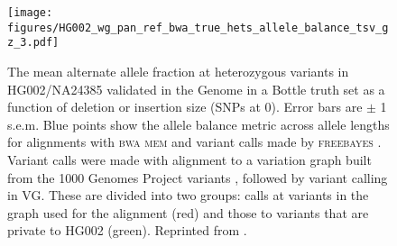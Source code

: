 
\begin{figure}[p]
\centering
\texttt{[image: figures/HG002\_wg\_pan\_ref\_bwa\_true\_hets\_allele\_balance\_tsv\_gz\_3.pdf]}
\caption[Indel allele balance in HG002]{The mean alternate allele fraction at heterozygous variants in HG002/NA24385 validated in the Genome in a Bottle truth set \cite{zook2014integrating} as a function of deletion or insertion size (SNPs at 0).
  Error bars are $\pm$ 1 s.e.m.
  Blue points show the allele balance metric across allele lengths for alignments with \textsc{bwa mem} \cite{Li_2013} and variant calls made by \textsc{freebayes} \cite{garrison2012haplotype}.
  Variant calls were made with alignment to a variation graph built from the 1000 Genomes Project variants \cite{1000_2015}, followed by variant calling in \textsc{VG}.
  These are divided into two groups: calls at variants in the graph used for the alignment (red) and those to variants that are private to HG002 (green).
  Reprinted from \cite{Garrison_2018}.}
\label{fig:het_allele_balance}
\end{figure}

